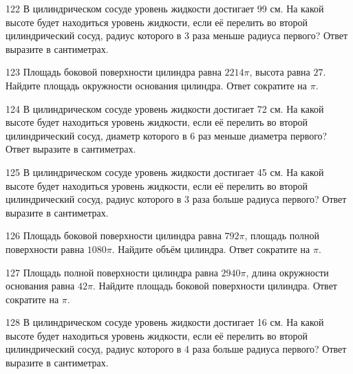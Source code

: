 \documentclass[4apaper]{article}
\begin{document}
\begin{taskBN}{122}
В цилиндрическом сосуде уровень жидкости достигает 99 см. На какой высоте будет находиться уровень жидкости, если её перелить во второй цилиндрический сосуд, радиус которого в 3 раза меньше радиуса первого? Ответ выразите в сантиметрах.
\end{taskBN}

\begin{taskBN}{123}
Площадь боковой поверхности цилиндра равна $2214\pi$, высота равна $27$. Найдите площадь окружности основания цилиндра. Ответ сократите на $\pi$.
\end{taskBN}

\begin{taskBN}{124}
В цилиндрическом сосуде уровень жидкости достигает 72 см. На какой высоте будет находиться уровень жидкости, если её перелить во второй цилиндрический сосуд, диаметр которого в 6 раз меньше диаметра первого? Ответ выразите в сантиметрах.
\end{taskBN}

\begin{taskBN}{125}
В цилиндрическом сосуде уровень жидкости достигает 45 см. На какой высоте будет находиться уровень жидкости, если её перелить во второй цилиндрический сосуд, радиус которого в 3 раза больше радиуса первого? Ответ выразите в сантиметрах.
\end{taskBN}

\begin{taskBN}{126}
Площадь боковой поверхности цилиндра равна $792\pi$, площадь полной поверхности равна $1080\pi$. Найдите объём цилиндра. Ответ сократите на $\pi$.
\end{taskBN}

\begin{taskBN}{127}
Площадь полной поверхности цилиндра равна $2940\pi$, длина окружности основания равна $42\pi$. Найдите площадь боковой поверхности цилиндра. Ответ сократите на $\pi$.
\end{taskBN}

\begin{taskBN}{128}
В цилиндрическом сосуде уровень жидкости достигает 16 см. На какой высоте будет находиться уровень жидкости, если её перелить во второй цилиндрический сосуд, радиус которого в 4 раза больше радиуса первого? Ответ выразите в сантиметрах.
\end{taskBN}
\end{document}
